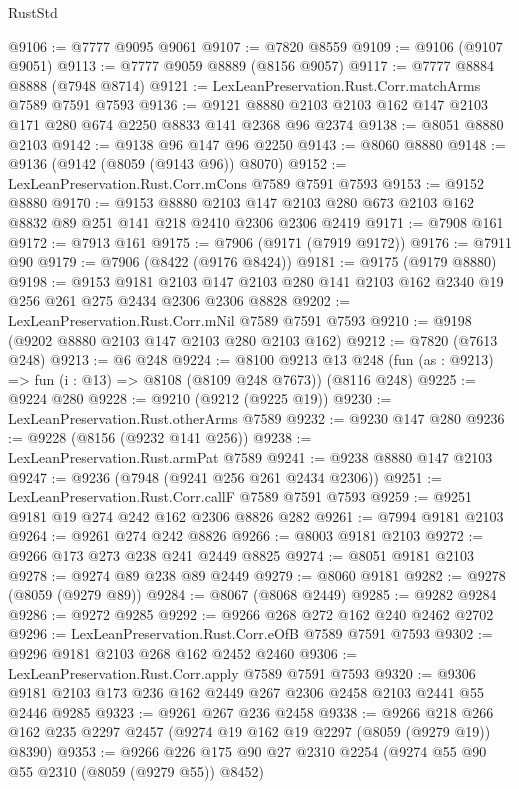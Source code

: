 \begin{lexlean}{RustStd}
\begin{coremodule}
@9106 := @7777 @9095 @9061
@9107 := @7820 @8559
@9109 := @9106 (@9107 @9051)
@9113 := @7777 @9059 @8889 (@8156 @9057)
@9117 := @7777 @8884 @8888 (@7948 @8714)
@9121 := LexLeanPreservation.Rust.Corr.matchArms @7589 @7591 @7593
@9136 := @9121 @8880 @2103 @2103 @162 @147 @2103 @171 @280 @674 @2250 @8833 @141 @2368 @96 @2374
@9138 := @8051 @8880 @2103
@9142 := @9138 @96 @147 @96 @2250
@9143 := @8060 @8880
@9148 := @9136 (@9142 (@8059 (@9143 @96)) @8070)
@9152 := LexLeanPreservation.Rust.Corr.mCons @7589 @7591 @7593
@9153 := @9152 @8880
@9170 := @9153
    @8880
    @2103
    @147
    @2103
    @280
    @673
    @2103
    @162
    @8832
    @89
    @251
    @141
    @218
    @2410
    @2306
    @2306
    @2419
@9171 := @7908 @161
@9172 := @7913 @161
@9175 := @7906 (@9171 (@7919 @9172))
@9176 := @7911 @90
@9179 := @7906 (@8422 (@9176 @8424))
@9181 := @9175 (@9179 @8880)
@9198 := @9153
    @9181
    @2103
    @147
    @2103
    @280
    @141
    @2103
    @162
    @2340
    @19
    @256
    @261
    @275
    @2434
    @2306
    @2306
    @8828
@9202 := LexLeanPreservation.Rust.Corr.mNil @7589 @7591 @7593
@9210 := @9198 (@9202 @8880 @2103 @147 @2103 @280 @2103 @162)
@9212 := @7820 (@7613 @248)
@9213 := @6 @248
@9224 := @8100
    @9213
    @13
    @248
    (fun (as : @9213) => fun (i : @13) => @8108 (@8109 @248 @7673))
    (@8116 @248)
@9225 := @9224 @280
@9228 := @9210 (@9212 (@9225 @19))
@9230 := LexLeanPreservation.Rust.otherArms @7589
@9232 := @9230 @147 @280
@9236 := @9228 (@8156 (@9232 @141 @256))
@9238 := LexLeanPreservation.Rust.armPat @7589
@9241 := @9238 @8880 @147 @2103
@9247 := @9236 (@7948 (@9241 @256 @261 @2434 @2306))
@9251 := LexLeanPreservation.Rust.Corr.callF @7589 @7591 @7593
@9259 := @9251 @9181 @19 @274 @242 @162 @2306 @8826 @282
@9261 := @7994 @9181 @2103
@9264 := @9261 @274 @242 @8826
@9266 := @8003 @9181 @2103
@9272 := @9266 @173 @273 @238 @241 @2449 @8825
@9274 := @8051 @9181 @2103
@9278 := @9274 @89 @238 @89 @2449
@9279 := @8060 @9181
@9282 := @9278 (@8059 (@9279 @89))
@9284 := @8067 (@8068 @2449)
@9285 := @9282 @9284
@9286 := @9272 @9285
@9292 := @9266 @268 @272 @162 @240 @2462 @2702
@9296 := LexLeanPreservation.Rust.Corr.eOfB @7589 @7591 @7593
@9302 := @9296 @9181 @2103 @268 @162 @2452 @2460
@9306 := LexLeanPreservation.Rust.Corr.apply @7589 @7591 @7593
@9320 := @9306 @9181 @2103 @173 @236 @162 @2449 @267 @2306 @2458 @2103 @2441 @55 @2446 @9285
@9323 := @9261 @267 @236 @2458
@9338 := @9266 @218 @266 @162 @235 @2297 @2457 (@9274 @19 @162 @19 @2297 (@8059 (@9279 @19)) @8390)
@9353 := @9266 @226 @175 @90 @27 @2310 @2254 (@9274 @55 @90 @55 @2310 (@8059 (@9279 @55)) @8452)

\end{coremodule}
\end{lexlean}
